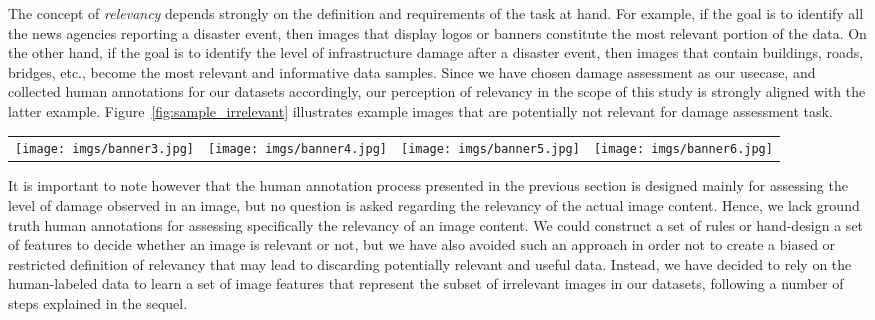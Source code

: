 \documentclass{iscram}
\begin{document}
The concept of \emph{relevancy} depends strongly on the definition and requirements of the task at hand. For example, if the goal is to identify all the news agencies reporting a disaster event, then images that display logos or banners constitute the most relevant portion of the data. On the other hand, if the goal is to identify the level of infrastructure damage after a disaster event, then images that contain buildings, roads, bridges, etc., become the most relevant and informative data samples. Since we have chosen damage assessment as our usecase, and collected human annotations for our datasets accordingly, our perception of relevancy in the scope of this study is strongly aligned with the latter example. Figure~\ref{fig:sample_irrelevant} illustrates example images that are potentially not relevant for damage assessment task.

\begin{figure*}[ht!]
\centering
\begin{tabular}{c c c c }
\texttt{[image: imgs/banner3.jpg]} 
&\texttt{[image: imgs/banner4.jpg]}
&\texttt{[image: imgs/banner5.jpg]}
&\texttt{[image: imgs/banner6.jpg]}\\
\end{tabular}
\caption{Examples of irrelevant images in our datasets showing cartoons, banners, advertisements, celebrities, etc.}
\label{fig:sample_irrelevant}
\end{figure*}

It is important to note however that the human annotation process presented in the previous section is designed mainly for assessing the level of damage observed in an image, but no question is asked regarding the relevancy of the actual image content. Hence, we lack ground truth human annotations for assessing specifically the relevancy of an image content. We could construct a set of rules or hand-design a set of features to decide whether an image is relevant or not, but we have also avoided such an approach in order not to create a biased or restricted definition of relevancy that may lead to discarding potentially relevant and useful data.
Instead, we have decided to rely on the human-labeled data to learn a set of image features that represent the subset of irrelevant images in our datasets, following a number of steps explained in the sequel.
\end{document}
